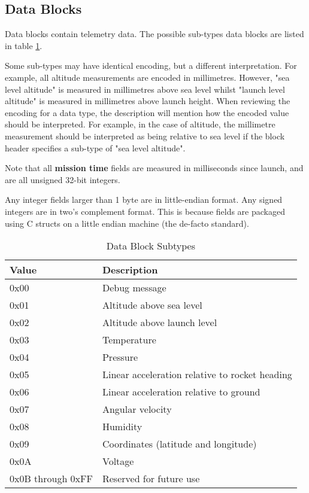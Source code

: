 \subsection{Data Blocks}

Data blocks contain telemetry data. The possible sub-types data blocks are listed in table \ref{table:data-subtypes}.

Some sub-types may have identical encoding, but a different interpretation. For example, all altitude measurements are
encoded in millimetres. However, "sea level altitude" is measured in millimetres above sea level whilst "launch level
altitude" is measured in millimetres above launch height. When reviewing the encoding for a data type, the description
will mention how the encoded value should be interpreted. For example, in the case of altitude, the millimetre
measurement should be interpreted as being relative to sea level if the block header specifies a sub-type of "sea level
altitude".

Note that all \textbf{mission time} fields are measured in milliseconds since launch, and are all unsigned 32-bit
integers.

Any integer fields larger than 1 byte are in little-endian format. Any signed integers are in two's complement format.
This is because fields are packaged using C structs on a little endian machine (the de-facto standard).

\begin{table}[H]
    \centering
    \begin{tabular}{@{}ll@{}}
        \toprule
        Value             & Description                                    \\
        \midrule
        0x00              & Debug message                                  \\
        0x01              & Altitude above sea level                       \\
        0x02              & Altitude above launch level                    \\
        0x03              & Temperature                                    \\
        0x04              & Pressure                                       \\
        0x05              & Linear acceleration relative to rocket heading \\
        0x06              & Linear acceleration relative to ground         \\
        0x07              & Angular velocity                               \\
        0x08              & Humidity                                       \\
        0x09              & Coordinates (latitude and longitude)           \\
        0x0A              & Voltage                                        \\
        0x0B through 0xFF & Reserved for future use                        \\
        \bottomrule
    \end{tabular}
    \caption{Data Block Subtypes}
    \label{table:data-subtypes}
\end{table}

